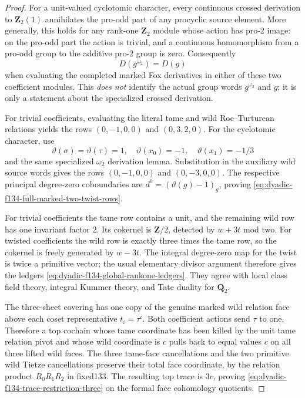 \documentclass[11pt]{article}
\theoremstyle{definition}
\begin{document}
\begin{proof}
For a unit-valued
cyclotomic character,
every continuous
crossed derivation
to $\mathbf Z_2(1)$
annihilates the
pro-odd part of
any procyclic
source element.
More generally,
this holds for
any rank-one
$\mathbf Z_2$
module whose
action has
pro-$2$ image:
on the pro-odd
part the action
is trivial,
and a continuous
homomorphism
from a pro-odd
group to the
additive pro-$2$
group is zero.
Consequently
\begin{equation}\label{eq:dyadic-f134-omega2-crossed-derivation}
\boxed{\qquad
D(g^{\omega_2})=D(g)
\qquad}
\end{equation}
when evaluating
the completed
marked Fox
derivatives in
either of these
two coefficient
modules.
This \emph{does
not} identify
the actual
group words
$g^{\omega_2}$
and $g$;
it is only
a statement
about the
specialized
crossed derivation.

For trivial
coefficients,
evaluating the
literal tame
and wild
Roe--Turturean
relations yields
the rows
$(0,-1,0,0)$
and $(0,3,2,0)$.
For the
cyclotomic
character, use
\[
\vartheta(\sigma)
=\vartheta(\tau)=1,\quad
\vartheta(x_0)=-1,\quad
\vartheta(x_1)=-1/3
\]
and the same
specialized
$\omega_2$
derivation lemma.
Substitution in
the auxiliary
wild source words
gives the rows
$(0,-1,0,0)$
and $(0,-3,0,0)$.
The respective
principal degree-zero
coboundaries
are
$d^0=(\vartheta(g)-1)_g$,
proving
\eqref{eq:dyadic-f134-full-marked-two-twist-rows}.

For trivial
coefficients
the tame row
contains a unit,
and the
remaining wild
row has one
invariant factor
$2$.  Its
cokernel is
$\mathbf Z/2$,
detected by
$w+3t$ mod two.
For twisted
coefficients
the wild row
is exactly
three times
the tame row,
so the cokernel
is freely
generated by
$w-3t$.
The integral
degree-zero
map for the
twist is twice
a primitive
vector; the
usual elementary
divisor argument
therefore gives
the ledgers
\eqref{eq:dyadic-f134-global-rankone-ledgers}.
They agree with
local class
field theory,
integral Kummer
theory, and Tate
duality for
$\mathbf Q_2$.

The three-sheet
covering has
one copy of
the genuine
marked wild
relation face
above each
coset representative
$t_i=\tau^i$.
Both coefficient
actions send
$\tau$ to one.
Therefore a
top cochain
whose tame
coordinate
has been killed
by the unit
tame relation
pivot and whose
wild coordinate
is $c$ pulls
back to equal
values $c$
on all three
lifted wild
faces.
The three
tame-face
cancellations
and the two
primitive wild
Tietze
cancellations
preserve their
total face
coordinate,
by the relation
product
$R_0R_1R_2$
in fixed133.
The resulting
top trace is
$3c$, proving
\eqref{eq:dyadic-f134-trace-restriction-three}
on the formal
face cohomology
quotients.


\end{proof}
\end{document}
